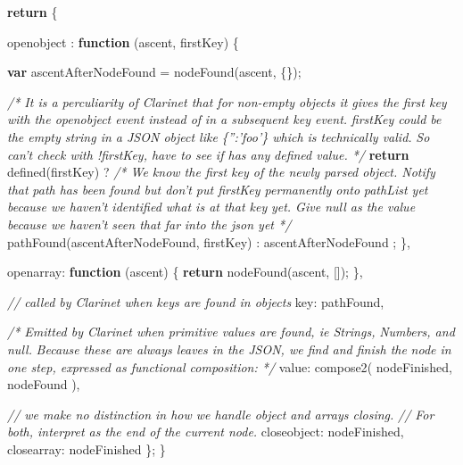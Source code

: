 \documentclass[12pt, ]{article}
\newenvironment{Shaded}{}{}
\newcommand{\KeywordTok}[1]{\textcolor[rgb]{0.00,0.44,0.13}{\textbf{{#1}}}}
\newcommand{\DataTypeTok}[1]{\textcolor[rgb]{0.56,0.13,0.00}{{#1}}}
\newcommand{\CommentTok}[1]{\textcolor[rgb]{0.38,0.63,0.69}{\textit{{#1}}}}
\newcommand{\FunctionTok}[1]{\textcolor[rgb]{0.02,0.16,0.49}{{#1}}}
\newcommand{\NormalTok}[1]{{#1}}
\begin{document}
\begin{Shaded}
\begin{Highlighting}[]
   \KeywordTok{return} \NormalTok{\{ }

      \DataTypeTok{openobject }\NormalTok{: }\KeywordTok{function} \NormalTok{(ascent, firstKey) \{}

         \KeywordTok{var} \NormalTok{ascentAfterNodeFound = }\FunctionTok{nodeFound}\NormalTok{(ascent, \{\});         }

         \CommentTok{/* It is a perculiarity of Clarinet that for non-empty objects it}
\CommentTok{            gives the first key with the openobject event instead of}
\CommentTok{            in a subsequent key event.}
\CommentTok{                      }
\CommentTok{            firstKey could be the empty string in a JSON object like }
\CommentTok{            \{'':'foo'\} which is technically valid.}
\CommentTok{            }
\CommentTok{            So can't check with !firstKey, have to see if has any }
\CommentTok{            defined value. */}
         \KeywordTok{return} \FunctionTok{defined}\NormalTok{(firstKey)}
         \NormalTok{?          }
            \CommentTok{/* We know the first key of the newly parsed object. Notify that }
\CommentTok{               path has been found but don't put firstKey permanently onto }
\CommentTok{               pathList yet because we haven't identified what is at that key }
\CommentTok{               yet. Give null as the value because we haven't seen that far }
\CommentTok{               into the json yet */}
            \FunctionTok{pathFound}\NormalTok{(ascentAfterNodeFound, firstKey)}
         \NormalTok{:}
            \NormalTok{ascentAfterNodeFound}
         \NormalTok{;}
      \NormalTok{\},}
    
      \DataTypeTok{openarray}\NormalTok{: }\KeywordTok{function} \NormalTok{(ascent) \{}
         \KeywordTok{return} \FunctionTok{nodeFound}\NormalTok{(ascent, []);}
      \NormalTok{\},}

      \CommentTok{// called by Clarinet when keys are found in objects               }
      \DataTypeTok{key}\NormalTok{: pathFound,}
      
      \CommentTok{/* Emitted by Clarinet when primitive values are found, ie Strings,}
\CommentTok{         Numbers, and null.}
\CommentTok{         Because these are always leaves in the JSON, we find and finish the }
\CommentTok{         node in one step, expressed as functional composition: */}
      \DataTypeTok{value}\NormalTok{: }\FunctionTok{compose2}\NormalTok{( nodeFinished, nodeFound ),}
      
      \CommentTok{// we make no distinction in how we handle object and arrays closing.}
      \CommentTok{// For both, interpret as the end of the current node.}
      \DataTypeTok{closeobject}\NormalTok{: nodeFinished,}
      \DataTypeTok{closearray}\NormalTok{: nodeFinished}
   \NormalTok{\};}
\NormalTok{\}}
\end{Highlighting}
\end{Shaded}
\end{document}
